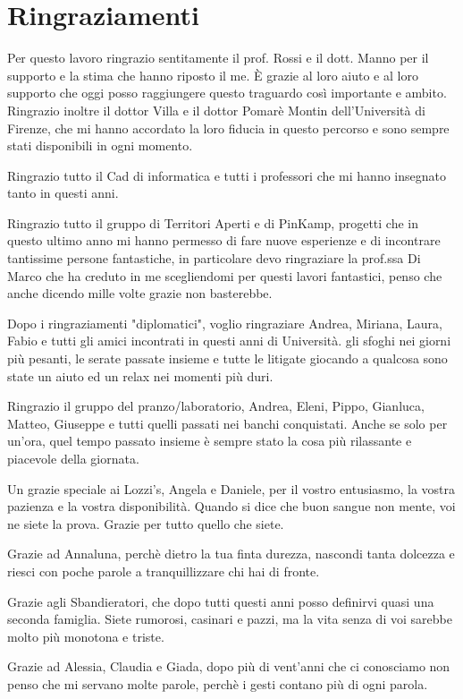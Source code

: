 \chapter*{Ringraziamenti}
\thispagestyle{empty}

Per questo lavoro ringrazio sentitamente il prof. Rossi e il dott. Manno per il supporto e la stima che hanno riposto il me. È grazie al loro aiuto e al loro supporto che oggi posso raggiungere questo traguardo così importante e ambito. 
Ringrazio inoltre il dottor Villa e il dottor Pomarè Montin dell'Università di Firenze, che mi hanno accordato la loro fiducia in questo percorso e sono sempre stati disponibili in ogni momento.

Ringrazio tutto il Cad di informatica e tutti i professori che mi hanno insegnato tanto in questi anni.

Ringrazio tutto il gruppo di Territori Aperti e di PinKamp, progetti che in questo ultimo anno mi hanno permesso di fare nuove esperienze e di incontrare tantissime persone fantastiche, in particolare devo ringraziare la prof.ssa Di Marco che ha creduto in me scegliendomi per questi lavori fantastici, penso che anche dicendo mille volte grazie non basterebbe.

Dopo i ringraziamenti "diplomatici", voglio ringraziare Andrea, Miriana, Laura, Fabio e tutti gli amici incontrati in questi anni di Università. gli sfoghi nei giorni più pesanti, le serate passate insieme e tutte le litigate giocando a qualcosa sono state un aiuto ed un relax nei momenti più duri.

Ringrazio il gruppo del pranzo/laboratorio, Andrea, Eleni, Pippo, Gianluca, Matteo, Giuseppe e tutti quelli passati nei banchi conquistati. Anche se solo per un'ora, quel tempo passato insieme è sempre stato la cosa più rilassante e piacevole della giornata.

Un grazie speciale ai Lozzi's, Angela e Daniele, per il vostro entusiasmo, la vostra pazienza e la vostra disponibilità. Quando si dice che buon sangue non mente, voi ne siete la prova. Grazie per tutto quello che siete.

Grazie ad Annaluna, perchè dietro la tua finta durezza, nascondi tanta dolcezza e riesci con poche parole a tranquillizzare chi hai di fronte.

Grazie agli Sbandieratori, che dopo tutti questi anni posso definirvi quasi una seconda famiglia. Siete rumorosi, casinari e pazzi, ma la vita senza di voi sarebbe molto più monotona e triste.

Grazie ad Alessia, Claudia e Giada, dopo più di vent'anni che ci conosciamo non penso che mi servano molte parole, perchè i gesti contano più di ogni parola.

